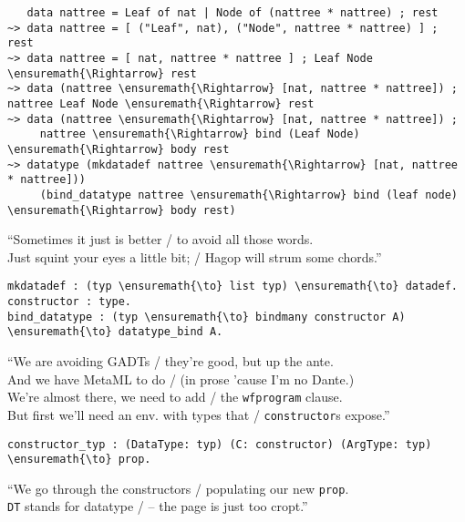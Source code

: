 \begin{verbatim}
   data nattree = Leaf of nat | Node of (nattree * nattree) ; rest
~> data nattree = [ ("Leaf", nat), ("Node", nattree * nattree) ] ; rest
~> data nattree = [ nat, nattree * nattree ] ; Leaf Node \ensuremath{\Rightarrow} rest
~> data (nattree \ensuremath{\Rightarrow} [nat, nattree * nattree]) ; nattree Leaf Node \ensuremath{\Rightarrow} rest
~> data (nattree \ensuremath{\Rightarrow} [nat, nattree * nattree]) ;
     nattree \ensuremath{\Rightarrow} bind (Leaf Node) \ensuremath{\Rightarrow} body rest
~> datatype (mkdatadef nattree \ensuremath{\Rightarrow} [nat, nattree * nattree]))
     (bind_datatype nattree \ensuremath{\Rightarrow} bind (leaf node) \ensuremath{\Rightarrow} body rest)
\end{verbatim}

\begin{versy}
``Sometimes it just is better / to avoid all those words. \\
Just squint your eyes a little bit; / Hagop will strum some chords.''
\end{versy}

\begin{verbatim}
mkdatadef : (typ \ensuremath{\to} list typ) \ensuremath{\to} datadef.
constructor : type.
bind_datatype : (typ \ensuremath{\to} bindmany constructor A) \ensuremath{\to} datatype_bind A.
\end{verbatim}

\begin{versy}
``We are avoiding GADTs / they're good, but up the ante. \\
And we have MetaML to do / (in prose 'cause I'm no Dante.) \\
We're almost there, we need to add / the \texttt{wfprogram} clause. \\
But first we'll need an env. with types that / \texttt{constructor}s expose.''
\end{versy}

\begin{verbatim}
constructor_typ : (DataType: typ) (C: constructor) (ArgType: typ) \ensuremath{\to} prop.
\end{verbatim}

\begin{versy}
``We go through the constructors / populating our new \texttt{prop}. \\
\texttt{DT} stands for datatype / -- the page is just too cropt.''
\end{versy}


